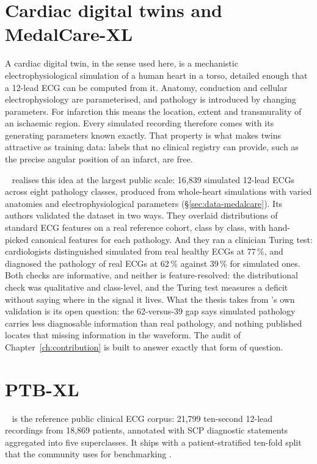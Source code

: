 \section{Cardiac digital twins and MedalCare-XL}
\label{sec:bg-twin}

A cardiac digital twin, in the sense used here, is a mechanistic electrophysiological simulation of a human heart in a torso, detailed enough that a 12-lead ECG can be computed from it. Anatomy, conduction and cellular electrophysiology are parameterised, and pathology is introduced by changing parameters. For infarction this means the location, extent and transmurality of an ischaemic region. Every simulated recording therefore comes with its generating parameters known exactly. That property is what makes twins attractive as training data: labels that no clinical registry can provide, such as the precise angular position of an infarct, are free.

\medalcare~\citep{gillette2023medalcare} realises this idea at the largest public scale: 16,839 simulated 12-lead ECGs across eight pathology classes, produced from whole-heart simulations with varied anatomies and electrophysiological parameters (\S\ref{sec:data-medalcare}). Its authors validated the dataset in two ways. They overlaid distributions of standard ECG features on a real reference cohort, class by class, with hand-picked canonical features for each pathology. And they ran a clinician Turing test: cardiologists distinguished simulated from real healthy ECGs at 77\,\%, and diagnosed the pathology of real ECGs at 62\,\% against 39\,\% for simulated ones. Both checks are informative, and neither is feature-resolved: the distributional check was qualitative and class-level, and the Turing test measures a deficit without saying where in the signal it lives. What the thesis takes from \medalcare's own validation is its open question: the 62-versus-39 gap says simulated pathology carries less diagnosable information than real pathology, and nothing published locates that missing information in the waveform. The audit of Chapter~\ref{ch:contribution} is built to answer exactly that form of question. 

\section{PTB-XL}
\label{sec:bg-ptbxl}

\ptbxl~\citep{wagner2020ptbxl} is the reference public clinical ECG corpus: 21,799 ten-second 12-lead recordings from 18,869 patients, annotated with SCP diagnostic statements aggregated into five superclasses. It ships with a patient-stratified ten-fold split that the community uses for benchmarking \citep{strodthoff2021deep}.

